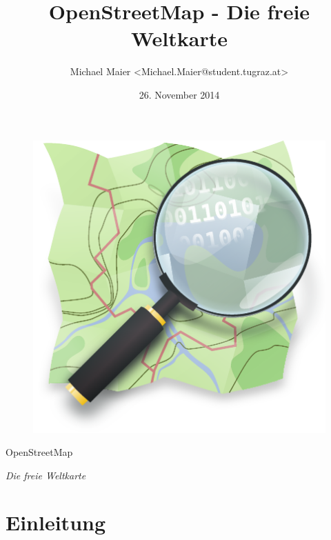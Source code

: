 \documentclass{beamer}
\title{OpenStreetMap - Die freie Weltkarte}
\author{Michael Maier \textless Michael.Maier@student.tugraz.at\textgreater}
\date{26. November 2014}
\begin{document}

\begin{frame} 


\begin{figure}
  \centering
  \includegraphics[width=.5\textwidth]{mag_map.pdf}
\end{figure}

\begin{center}
\Huge{OpenStreetMap\\}
\end{center}

\begin{center}
\Large{\emph{Die freie Weltkarte}}
\end{center}

\end{frame}



%

%



\section{Einleitung}
\end{document}
